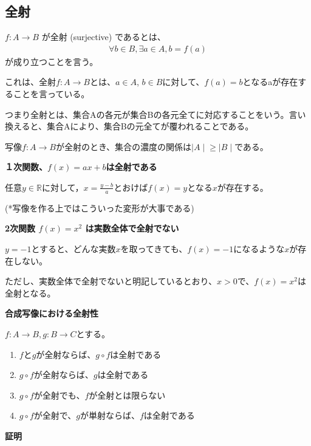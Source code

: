 \documentclass[dvipdfmx,autodetect-engine]{jsarticle}
\begin{document}
\subsection{全射}

$f: A \to B$ が全射 (surjective) であるとは、
\begin{eqnarray*}
\forall b \in B, \exists a \in A, b = f(a)
\end{eqnarray*}
が成り立つことを言う。

これは、全射$f: A \to B$とは、$a \in A$, $b \in B$に対して、$f(a) = b$となるaが存在することを言っている。

つまり全射とは、集合Aの各元が集合Bの各元全てに対応することをいう。言い換えると、集合Aにより、集合Bの元全てが覆われることである。

写像$f: A \to B$が全射のとき、集合の濃度の関係は${\mid A \mid} \geq {\mid B \mid}$である。

\exam

{\bf １次関数、$f(x) = ax+b$は全射である}

任意$y \in \mathbb{R}$に対して，$x = \frac{y-b}{a}$とおけば$f(x) = y$となる$x$が存在する。

(*写像を作る上ではこういった変形が大事である)


\exam
{\bf 2次関数 $f(x)=x^2$ は実数全体で全射でない}

$y=-1$とすると、どんな実数$x$を取ってきても、$f(x) = -1$になるような$x$が存在しない。

ただし、実数全体で全射でないと明記しているとおり、$x > 0$で、$f(x)=x^2$は全射となる。


\prop

 {\bf 合成写像における全射性 }
 
 $f:A \to B, g: B \to C$とする。

\begin{enumerate}
\renewcommand{\labelenumi}{(\arabic{enumi})}
	\item $f$と$g$が全射ならば、$g \circ f$は全射である
	\item $g \circ f$が全射ならば、$g$は全射である
	\item $g \circ f$が全射でも、$f$が全射とは限らない
	\item $g \circ f$が全射で、$g$が単射ならば、$f$は全射である
\end{enumerate}

{ \bf 証明}
\end{document}
